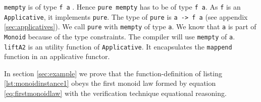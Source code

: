 \verb|mempty| is of type \verb|f a| . Hence \verb|pure mempty| has to be of type \verb|f a|.
As \verb|f| is an \verb|Applicative|, it implements \verb|pure|. The type of \verb|pure| is \verb|a -> f a| (see appendix \ref{sec:applicatives}). We call \verb|pure| with \verb|mempty| of type \verb|a|. We know that \verb|a| is part of \verb|Monoid| because of the type constraints. The compiler will use \verb|mempty| of \verb|a|. \verb|liftA2| is an utility function of \verb|Applicative|. It encapsulates the \verb|mappend| function in an applicative functor. 

In section \ref{sec:example} we prove that the \gls{function-definition} of listing \ref{lst:monoidinstance1} obeys the first monoid law formed by equation \ref{eq:firstmonoidlaw} with  the verification technique equational reasoning.


